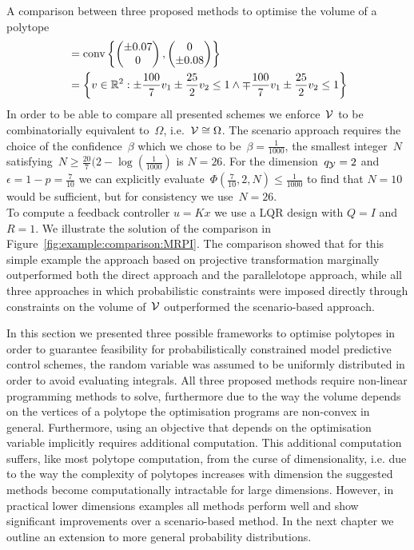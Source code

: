 \begin{example}{A comparison between three proposed methods to optimise the volume of a polytope}
\begin{equation}
\begin{aligned}
&=\text{conv}\left\{\begin{pmatrix}\pm0.07\\0\end{pmatrix},\begin{pmatrix}0\\\pm0.08\end{pmatrix}\right\}\\
&=\left\{v\in\mathbb R^2:\pm\frac{100}{7}v_1\pm\frac{25}{2}v_2\leq1\wedge\mp\frac{100}{7}v_1\pm\frac{25}{2}v_2\leq1\right\}
\end{aligned}\end{equation}
%
In order to be able to compare all presented schemes we enforce~$\mathcal V$ to be combinatorially equivalent to~$\Omega$, i.e.~$\mathcal V\cong\Omega$.
%
The scenario approach requires the choice of the confidence~$\beta$ which we chose to be~$\beta=\frac{1}{1000}$, the smallest integer~$N$ satisfying~$N\geq\frac{20}{7}(2-\log(\frac{1}{1000})$ is $N=26$.
%
For the dimension~$q_\mathcal Y=2$ and~$\epsilon=1-p=\frac{7}{10}$ we can explicitly evaluate~$\Phi(\frac{7}{10},2,N)\leq\frac{1}{1000}$ to find that $N=10$ would be sufficient, but for consistency we use~$N=26$.
%
\\[1em]
%
To compute a feedback controller $u=Kx$ we use a LQR design with $Q=I$ and $R=1$.
%
We illustrate the solution of the comparison in Figure~\ref{fig:example:comparison:MRPI}.
%
The comparison showed that for this simple example the approach based on projective transformation marginally outperformed both the direct approach and the parallelotope approach, while all three approaches in which probabilistic constraints were imposed directly through constraints on the volume of~$\mathcal V$ outperformed the scenario-based approach.
%
%

\end{example}
%
\noindent In this section we presented three possible frameworks to optimise polytopes in order to guarantee feasibility for probabilistically constrained model predictive control schemes, the random variable was assumed to be uniformly distributed in order to avoid evaluating integrals.
%
All three proposed methods require non-linear programming methods to solve, furthermore due to the way the volume depends on the vertices of a polytope the optimisation programs are non-convex in general.
%
Furthermore, using an objective that  depends on the optimisation variable implicitly requires additional computation.
%
This additional computation suffers, like most polytope computation, from the curse of dimensionality, i.e. due to the way the complexity of polytopes increases with dimension the suggested methods become computationally intractable for large dimensions.
%
However, in practical lower dimensions examples all methods perform well and show significant improvements over a scenario-based method.
%
In the next chapter we outline an extension to more general probability distributions.
%
%
%
%
%